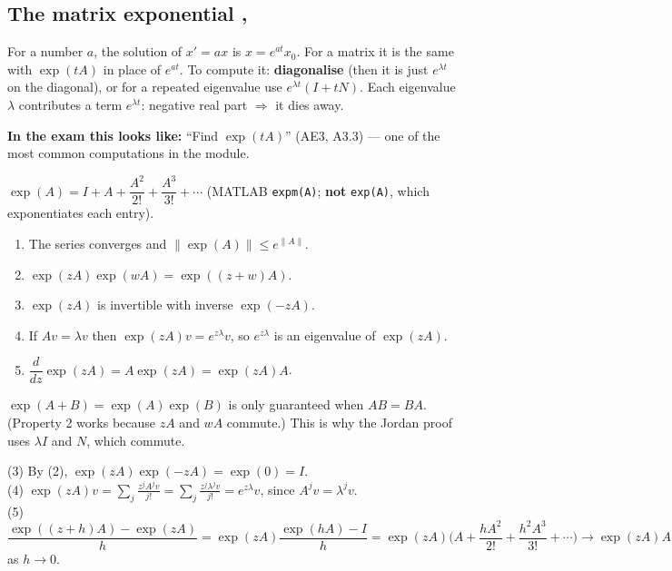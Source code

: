 \subsection{The matrix exponential \texorpdfstring{, }{}}\label{sec:exp}\label{ss:2-6}
\begin{plainbox}
For a number $a$, the solution of $x'=ax$ is $x=e^{at}x_0$. For a matrix it is the same with $\exp(tA)$ in place of $e^{at}$.
To compute it: \textbf{diagonalise} (then it is just $e^{\lambda t}$ on the diagonal), or for a repeated eigenvalue use
$e^{\lambda t}(I+tN)$. Each eigenvalue $\lambda$ contributes a term $e^{\lambda t}$: negative real part $\Rightarrow$ it dies away.
\par\smallskip\textbf{In the exam this looks like:} ``Find $\exp(tA)$'' (AE3, A3.3) --- one of the most common computations in the module.
\end{plainbox}
\begin{defbox}
$\exp(A)=I+A+\dfrac{A^2}{2!}+\dfrac{A^3}{3!}+\cdots$ (MATLAB \texttt{expm(A)}; \textbf{not} \texttt{exp(A)}, which exponentiates each entry).
\end{defbox}
\begin{thmbox}[title={Proposition 0.14 (Wedderburn)}]
\begin{enumerate}
\item The series converges and $\|\exp(A)\|\le e^{\|A\|}$.
\item $\exp(zA)\exp(wA)=\exp((z+w)A)$.
\item $\exp(zA)$ is invertible with inverse $\exp(-zA)$.
\item If $Av=\lambda v$ then $\exp(zA)v=e^{z\lambda}v$, so $e^{z\lambda}$ is an eigenvalue of $\exp(zA)$.
\item $\dfrac{d}{dz}\exp(zA)=A\exp(zA)=\exp(zA)A$.
\end{enumerate}
\end{thmbox}
\begin{warnbox}
$\exp(A+B)=\exp(A)\exp(B)$ is only guaranteed when $AB=BA$. (Property 2 works because $zA$ and $wA$ commute.) This is why the Jordan proof uses $\lambda I$ and $N$, which commute.
\end{warnbox}
\begin{proofbox}[title={Proofs of (3), (4), (5)}]
(3) By (2), $\exp(zA)\exp(-zA)=\exp(0)=I$.\\
(4) $\exp(zA)v=\sum_j\frac{z^jA^jv}{j!}=\sum_j\frac{z^j\lambda^jv}{j!}=e^{z\lambda}v$, since $A^jv=\lambda^jv$.\\
(5) $\dfrac{\exp((z+h)A)-\exp(zA)}{h}=\exp(zA)\dfrac{\exp(hA)-I}{h}=\exp(zA)\Big(A+\dfrac{hA^2}{2!}+\dfrac{h^2A^3}{3!}+\cdots\Big)\to\exp(zA)A$ as $h\to0$.
\end{proofbox}

